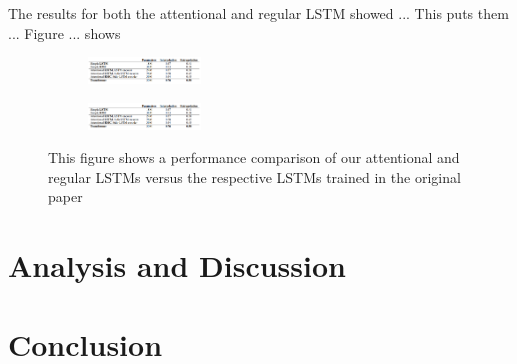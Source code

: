 The results for both the attentional and regular LSTM showed ... This puts them ... Figure ... shows 

\begin{figure}
\centering
\begin{subfigure}{\textwidth}
  \centering
  \includegraphics[width=3cm]{images/test_image.PNG}
  \label{fig:sub1}
\end{subfigure}%
\begin{subfigure}{\textwidth}
  \centering
  \includegraphics[width=3cm]{images/test_image.PNG}
  \label{fig:sub2}
\end{subfigure}
\caption{This figure shows a performance comparison of our attentional and regular LSTMs versus the respective LSTMs trained in the original paper}
\label{fig:test}
\end{figure}


\section{Analysis and Discussion}


\section{Conclusion}

